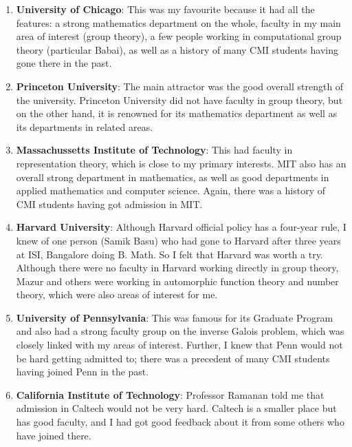 \documentclass[a4paper]{amsart}
\begin{document}
\begin{enumerate}

\item {\bf University of Chicago}: This was my favourite because it had
  all the features: a strong mathematics department on the whole,
  faculty in my main area of interest (group theory), a few people
  working in computational group theory (particular Babai), as well
  as a history of many CMI students having gone there in the past.

\item {\bf Princeton University}: The main attractor was the good
  overall strength of the university. Princeton University did not
  have faculty in group theory, but on the other hand, it is renowned
  for its mathematics department as well as its departments in related
  areas.

\item {\bf Massachussetts Institute of Technology}: This had faculty
  in representation theory, which is close to my primary interests.
  MIT also has an overall strong department in mathematics, as well as good
  departments in applied mathematics and computer science. Again, there
  was a history of CMI students having got admission in MIT.

\item {\bf Harvard University}: Although Harvard official policy has a
  four-year rule, I knew of one person (Samik Basu) who had gone to
  Harvard after three years at ISI, Bangalore doing B. Math. So I felt
  that Harvard was worth a try. Although there were no faculty
  in Harvard working directly in group theory, Mazur and others
  were working in automorphic function theory and number theory,
  which were also areas of interest for me.

\item {\bf University of Pennsylvania}: This was famous for its Graduate
  Program and also had a strong faculty group on the inverse Galois problem,
  which was closely linked with my areas of interest. Further, I knew
  that Penn would not be hard getting admitted to; there was a precedent
  of many CMI students having joined Penn in the past.

\item {\bf California Institute of Technology}: Professor Ramanan
  told me that admission in Caltech would not be very hard. Caltech
  is a smaller place but has good faculty, and I had got good feedback
  about it from some others who have joined there.


\end{enumerate}
\end{document}
